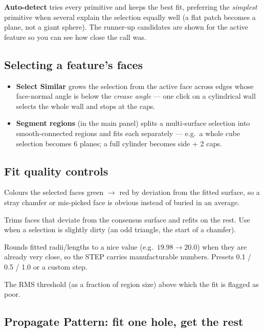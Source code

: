 \documentclass[11pt,a4paper]{article}
\newcommand{\ui}[1]{\textsf{\textbf{#1}}}   %
\begin{document}
\ui{Auto-detect} tries every primitive and keeps the best fit, preferring the
\emph{simplest} primitive when several explain the selection equally well
(a flat patch becomes a plane, not a giant sphere). The runner-up candidates
are shown for the active feature so you can see how close the call was.

\subsection{Selecting a feature's faces}

\begin{itemize}[nosep]
  \item \ui{Select Similar} grows the selection from the active face across
    edges whose face-normal angle is below the \emph{crease angle} --- one
    click on a cylindrical wall selects the whole wall and stops at the caps.
  \item \ui{Segment regions} (in the main panel) splits a multi-surface
    selection into smooth-connected regions and fits each separately --- e.g.\
    a whole cube selection becomes 6 planes; a full cylinder becomes side +
    2 caps.
\end{itemize}

\subsection{Fit quality controls}

\begin{description}[style=nextline]
  \item[Fit-quality heatmap] Colours the selected faces green $\to$ red by
    deviation from the fitted surface, so a stray chamfer or mis-picked face
    is obvious instead of buried in an average.
  \item[Reject outliers (RANSAC)] Trims faces that deviate from the consensus
    surface and refits on the rest. Use when a selection is slightly dirty
    (an odd triangle, the start of a chamfer).
  \item[Snap dimensions] Rounds fitted radii/lengths to a nice value
    (e.g.\ $19.98 \to 20.0$) when they are already very close, so the STEP
    carries manufacturable numbers. Presets 0.1 / 0.5 / 1.0 or a custom step.
  \item[Tolerance] The RMS threshold (as a fraction of region size) above
    which the fit is flagged as poor.
\end{description}

\subsection{Propagate Pattern: fit one hole, get the rest}
\end{document}
